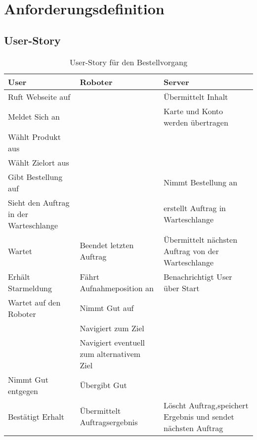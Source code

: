 %
%
\chapter{Anforderungsdefinition} \label{Kap:3}




\section{User-Story}

\begin{table}[!ht]%
\begin{tabular}{p{40mm}|p{45mm}|p{55mm}} 
 User & Roboter & Server \\
\hline \hline
Ruft Webseite auf & & Übermittelt Inhalt\\
\hline
Meldet Sich an & & Karte und Konto werden übertragen\\
\hline
Wählt Produkt aus & &\\
\hline
Wählt Zielort aus & & \\
\hline
Gibt Bestellung auf & & Nimmt Bestellung an\\
\hline
Sieht den Auftrag in der Warteschlange & & erstellt Auftrag in Warteschlange\\
\hline
Wartet& Beendet letzten Auftrag & Übermittelt nächsten Auftrag von der Warteschlange\\
\hline
Erhält Starmeldung& Fährt Aufnahmeposition an & Benachrichtigt User über Start\\
\hline
Wartet auf den Roboter & Nimmt Gut auf &\\
\hline
& Navigiert zum Ziel &\\
\hline
& Navigiert eventuell zum alternativem Ziel &\\
\hline
Nimmt Gut entgegen & Übergibt Gut & \\
\hline
Bestätigt Erhalt & Übermittelt Auftragsergebnis & Löscht Auftrag,speichert Ergebnis und sendet nächsten Auftrag\\
\end{tabular}
\caption{User-Story für den Bestellvorgang}
\label{fig:user-story}
\end{table}

